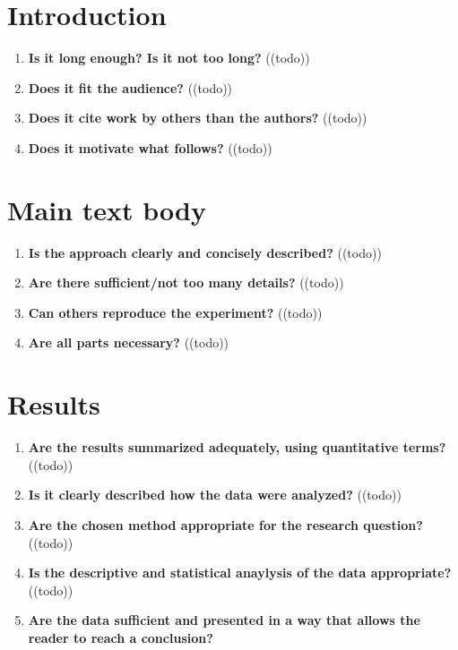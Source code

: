 \section{Introduction}\label{sec:introduction}
\begin{enumerate}[resume]
    \item \textbf{Is it long enough? Is it not too long?} 	\textcolor{HighlightColor}{((todo))}
    \item \textbf{Does it fit the audience?} 	\textcolor{HighlightColor}{((todo))}
    \item \textbf{Does it cite work by others than the authors?} 	\textcolor{HighlightColor}{((todo))}
    \item \textbf{Does it motivate what follows?} 	\textcolor{HighlightColor}{((todo))}
\end{enumerate}

\section{Main text body}\label{sec:main}
\begin{enumerate}[resume]
    \item \textbf{Is the approach clearly and concisely described?} 	\textcolor{HighlightColor}{((todo))}
    \item \textbf{Are there sufficient/not too many details?} 	\textcolor{HighlightColor}{((todo))}
    \item \textbf{Can others reproduce the experiment?} 	\textcolor{HighlightColor}{((todo))}
    \item \textbf{Are all parts necessary?} 	\textcolor{HighlightColor}{((todo))}
\end{enumerate}

\section{Results}\label{sec:results}
\begin{enumerate}[resume]
     \item \textbf{Are the results summarized adequately, using quantitative terms?} 	\textcolor{HighlightColor}{((todo))}
      \item \textbf{Is it clearly described how the data were analyzed?} 	\textcolor{HighlightColor}{((todo))}
       \item \textbf{Are the chosen method appropriate for the research question?} 	\textcolor{HighlightColor}{((todo))}
    \item \textbf{Is the descriptive and statistical anaylysis of the data appropriate?} 	\textcolor{HighlightColor}{((todo))}
    \item \textbf{Are the data sufficient and presented in a way that allows the reader to reach a conclusion?} 
\end{enumerate}

